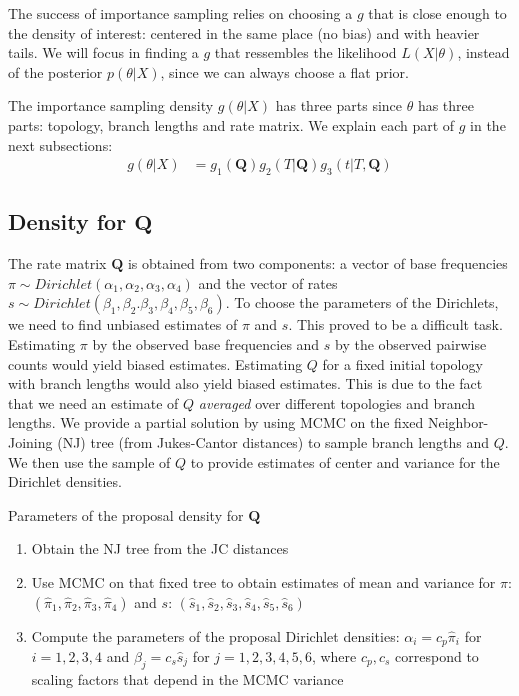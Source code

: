 \documentclass[conference]{IEEEtran}
\begin{document}
The success of importance sampling relies on choosing a $g$ that is
close enough to the density of interest: centered in the same place
(no bias) and with heavier tails. We will focus in finding a $g$ that
ressembles the likelihood $L(X|\theta)$, instead of the posterior
$p(\theta|X)$, since we can always choose a flat prior.

The importance sampling density $g(\theta|X)$ has three parts since
$\theta$ has three parts: topology, branch lengths and rate matrix. We
explain each part of $g$ in the next subsections:
\begin{align*}
g(\theta|X) &= g_1(\mathbf{Q})g_2(T|\mathbf{Q})g_3(t|T,\mathbf{Q})
\end{align*}

\subsection*{Density for $\mathbf{Q}$}
The rate matrix $\mathbf{Q}$ is obtained from two components: a vector
of base frequencies $\pi\sim
Dirichlet(\alpha_1,\alpha_2,\alpha_3,\alpha_4)$ and the vector of
rates $s\sim
Dirichlet(\beta_1,\beta_2.\beta_3,\beta_4,\beta_5,\beta_6)$. To choose
the parameters of the Dirichlets, we need to find unbiased estimates
of $\pi$ and $s$. This proved to be a difficult task. Estimating $\pi$
by the observed base frequencies and $s$ by the observed pairwise
counts would yield biased estimates. Estimating $Q$ for a fixed
initial topology with branch lengths would also yield biased
estimates. This is due to the fact that we need an estimate of $Q$
\textit{averaged} over different topologies and branch lengths.  We
provide a partial solution by using MCMC on the fixed Neighbor-Joining
(NJ) tree (from Jukes-Cantor distances) to sample branch lengths and
$Q$. We then use the sample of $Q$ to provide estimates of center and
variance for the Dirichlet densities.

\begin{algorithm}
\caption{Parameters of the proposal density for $\mathbf{Q}$}
\begin{enumerate}
\item{Obtain the NJ tree from the JC distances}
\item{Use MCMC on that fixed tree to obtain estimates of mean and
    variance for $\pi$:
    $(\hat{\pi}_1,\hat{\pi}_2,\hat{\pi}_3,\hat{\pi}_4)$ and $s$:
    $(\hat{s}_1,\hat{s}_2,\hat{s}_3,\hat{s}_4,\hat{s}_5,\hat{s}_6)$}
\item{Compute the parameters of the proposal Dirichlet densities:
    $\alpha_i=c_p\hat{\pi}_i$ for $i=1,2,3,4$ and
    $\beta_j=c_s\hat{s}_j$ for $j=1,2,3,4,5,6$, where $c_p,c_s$
    correspond to scaling factors that depend in the MCMC variance}
\end{enumerate}
\end{algorithm}
\end{document}
